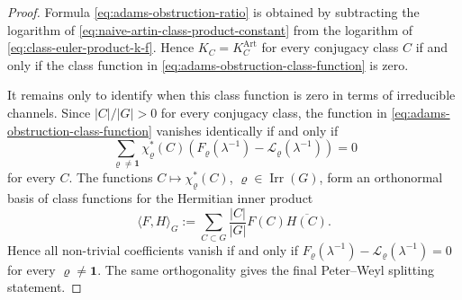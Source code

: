 \documentclass[11pt,a4paper]{amsart}
\theoremstyle{plain}
\theoremstyle{definition}
\theoremstyle{remark}
\DeclareMathOperator{\Irr}{Irr}
\begin{document}
\begin{proof}
  Formula \eqref{eq:adams-obstruction-ratio} is obtained by subtracting
  the logarithm of \eqref{eq:naive-artin-class-product-constant} from
  the logarithm of \eqref{eq:class-euler-product-k-f}. Hence
  \(K_C=K_C^{\mathrm{Art}}\) for every conjugacy class \(C\) if and only
  if the class function in
  \eqref{eq:adams-obstruction-class-function} is zero.

  It remains only to identify when this class function is zero in terms
  of irreducible channels. Since \(|C|/|G|>0\) for every conjugacy class,
  the function in \eqref{eq:adams-obstruction-class-function} vanishes
  identically if and only if
  \[
    \sum_{\varrho\neq\mathbf1}\chi_\varrho^\ast(C)
      \left(F_\varrho(\lambda^{-1})-
      \mathcal L_\varrho(\lambda^{-1})\right)
    =0
  \]
  for every \(C\). The functions
  \(C\mapsto \chi_\varrho^\ast(C)\), \(\varrho\in\Irr(G)\), form an
  orthonormal basis of class functions for the Hermitian inner product
  \[
    \langle F,H\rangle_G
    :=
    \sum_{C\subset G}\frac{|C|}{|G|}F(C)\overline{H(C)}.
  \]
  Hence all non-trivial coefficients vanish if and only if
  \(F_\varrho(\lambda^{-1})-
  \mathcal L_\varrho(\lambda^{-1})=0\) for every
  \(\varrho\neq\mathbf1\). The same orthogonality gives the final
  Peter--Weyl splitting statement.
\end{proof}
\end{document}
